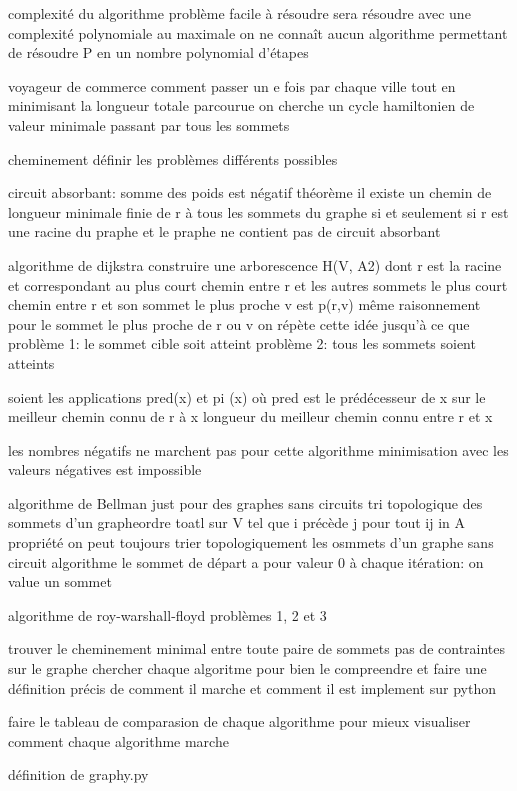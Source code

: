 \documentclass{article}
\begin{document}
complexité du algorithme
problème facile à résoudre sera résoudre avec une complexité polynomiale au maximale
on ne connaît aucun algorithme permettant de résoudre P en un nombre polynomial d'étapes


voyageur de commerce
comment passer un e fois par chaque ville tout en minimisant la longueur totale parcourue
on cherche un cycle hamiltonien de valeur minimale
passant par tous les sommets


cheminement
définir les problèmes différents possibles


circuit absorbant: somme des poids est négatif
théorème il existe un chemin de longueur minimale finie de r à tous les sommets du graphe
si et seulement si r est une racine du praphe et le praphe ne contient pas de circuit absorbant

algorithme de dijkstra
construire une arborescence H(V, A2) dont r est la racine et correspondant au plus court chemin entre r et les autres sommets
le plus court chemin entre r et son sommet le plus proche v est p(r,v)
même raisonnement pour le sommet le plus proche de r ou v
on répète cette idée jusqu'à ce que
    problème 1: le sommet cible soit atteint
    problème 2: tous les sommets soient atteints

soient les applications pred(x) et pi (x)
    où pred est le prédécesseur de x sur le meilleur chemin connu de r à x
    longueur du meilleur chemin connu entre r et x

    les nombres négatifs ne marchent pas pour cette algorithme
    minimisation avec les valeurs négatives est impossible



algorithme de Bellman
just pour des graphes sans circuits
tri topologique des sommets d'un grapheordre toatl sur V tel que i précède j pour tout ij in A
propriété on peut toujours trier topologiquement les osmmets d'un graphe sans circuit
algorithme
    le sommet de départ a pour valeur 0
    à chaque itération: on value un sommet


algorithme de roy-warshall-floyd
problèmes 1, 2 et 3

trouver le cheminement minimal entre toute paire de sommets pas de contraintes sur le graphe
chercher chaque algoritme pour bien le compreendre et faire une définition précis de comment il marche et comment il est implement sur python


faire le tableau de comparasion de chaque algorithme pour mieux visualiser comment chaque algorithme marche


définition de graphy.py
\end{document}
